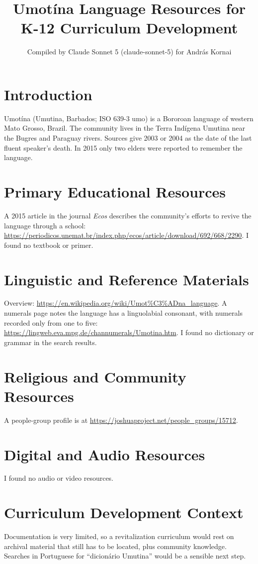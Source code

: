 \documentclass[12pt]{article}
\title{Umot\'ina Language Resources for K-12 Curriculum Development}
\author{Compiled by Claude Sonnet 5 (claude-sonnet-5) for Andr\'as Kornai}
\date{}
\begin{document}
\maketitle
\section{Introduction}
Umot\'ina (Umutina, Barbados; ISO 639-3 umo) is a Bororoan language of western Mato Grosso, Brazil. The community lives in the Terra Ind\'igena Umutina near the Bugres and Paraguay rivers. Sources give 2003 or 2004 as the date of the last fluent speaker's death. In 2015 only two elders were reported to remember the language.
\section{Primary Educational Resources}
A 2015 article in the journal \emph{Ecos} describes the community's efforts to revive the language through a school: \url{https://periodicos.unemat.br/index.php/ecos/article/download/692/668/2290}. I found no textbook or primer.
\section{Linguistic and Reference Materials}
Overview: \url{https://en.wikipedia.org/wiki/Umot%C3%ADna_language}. A numerals page notes the language has a linguolabial consonant, with numerals recorded only from one to five: \url{https://lingweb.eva.mpg.de/channumerals/Umotina.htm}. I found no dictionary or grammar in the search results.
\section{Religious and Community Resources}
A people-group profile is at \url{https://joshuaproject.net/people_groups/15712}.
\section{Digital and Audio Resources}
I found no audio or video resources.
\section{Curriculum Development Context}
Documentation is very limited, so a revitalization curriculum would rest on archival material that still has to be located, plus community knowledge. Searches in Portuguese for ``dicion\'ario Umutina'' would be a sensible next step.
\end{document}
